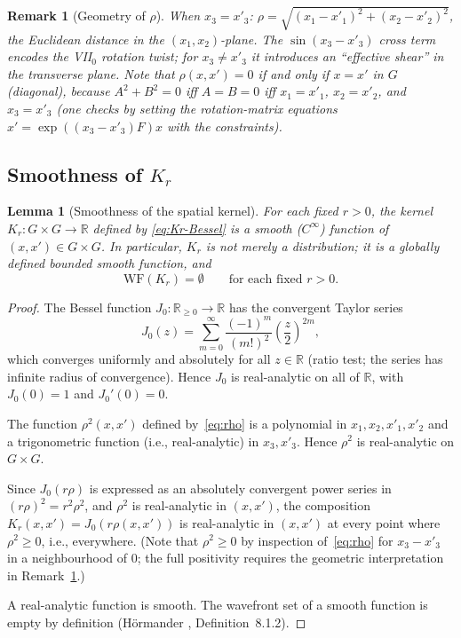\documentclass[12pt, a4paper]{article}
\newtheorem{lemma}[theorem]{Lemma}
\newtheorem{remark}[theorem]{Remark}
\theoremstyle{remark}
\newcommand{\bR}{\mathbb{R}}
\newcommand{\WF}{\mathrm{WF}}
\begin{document}
\begin{remark}[Geometry of $\rho$]\label{rem:rho}
  When $x_3 = x'_3$: $\rho = \sqrt{(x_1-x'_1)^2+(x_2-x'_2)^2}$,
  the Euclidean distance in the $(x_1,x_2)$-plane.
  The $\sin(x_3-x'_3)$ cross term encodes the VII$_0$ rotation twist;
  for $x_3 \ne x'_3$ it introduces an ``effective shear'' in the transverse
  plane.  Note that $\rho(x,x') = 0$ if and only if $x = x'$ in $G$
  (diagonal), because $A^2+B^2 = 0$ iff $A=B=0$ iff $x_1=x'_1$,
  $x_2=x'_2$, and $x_3=x'_3$ (one checks by setting the rotation-matrix
  equations $x' = \exp((x_3-x'_3)F)x$ with the constraints).
\end{remark}

\subsection{Smoothness of $K_r$}

\begin{lemma}[Smoothness of the spatial kernel]\label{lem:Kr-smooth}
  For each fixed $r > 0$, the kernel $K_r \colon G \times G \to \bR$
  defined by \eqref{eq:Kr-Bessel} is a \emph{smooth} ($C^\infty$) function
  of $(x, x') \in G \times G$.
  In particular, $K_r$ is not merely a distribution; it is a globally
  defined bounded smooth function, and
  \begin{equation}
    \WF(K_r) = \emptyset \qquad \text{for each fixed } r > 0.
  \end{equation}
\end{lemma}

\begin{proof}
  The Bessel function $J_0 \colon \bR_{\ge 0} \to \bR$ has the
  convergent Taylor series
  \begin{equation}\label{eq:J0-series}
    J_0(z) = \sum_{m=0}^\infty \frac{(-1)^m}{(m!)^2}
              \!\left(\frac{z}{2}\right)^{2m},
  \end{equation}
  which converges uniformly and absolutely for all $z \in \bR$
  (ratio test; the series has infinite radius of convergence).
  Hence $J_0$ is real-analytic on all of $\bR$, with $J_0(0) = 1$
  and $J_0'(0) = 0$.

  The function $\rho^2(x,x')$ defined by~\eqref{eq:rho} is a
  polynomial in $x_1,x_2,x'_1,x'_2$ and a trigonometric function
  (i.e., real-analytic) in $x_3, x'_3$.  Hence $\rho^2$ is
  real-analytic on $G \times G$.

  Since $J_0(r\rho)$ is expressed as an absolutely convergent power
  series in $(r\rho)^2 = r^2\rho^2$, and $\rho^2$ is real-analytic
  in $(x,x')$, the composition $K_r(x,x') = J_0(r\rho(x,x'))$
  is real-analytic in $(x,x')$ at every point where $\rho^2 \ge 0$,
  i.e., everywhere.  (Note that $\rho^2 \ge 0$ by inspection of~\eqref{eq:rho}
  for $x_3 - x'_3$ in a neighbourhood of $0$; the full positivity requires
  the geometric interpretation in Remark~\ref{rem:rho}.)

  A real-analytic function is smooth.  The wavefront set of a smooth
  function is empty by definition
  (H\"ormander \cite{Hor90}, Definition~8.1.2).
\end{proof}
\end{document}
